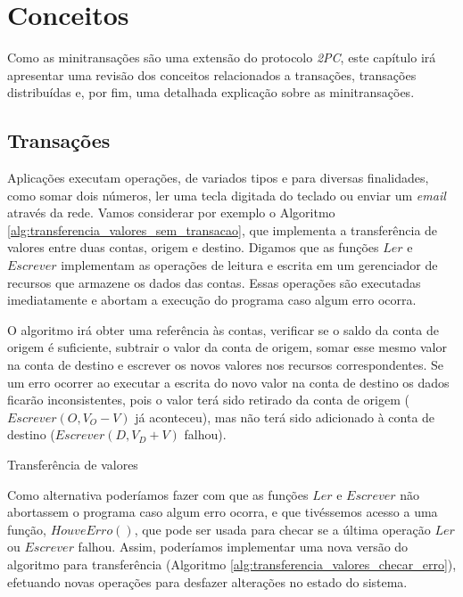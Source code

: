 \documentclass[11pt,twoside,a4paper]{book}
\begin{document}
\chapter{Conceitos}
\label{chap:conceitos}
Como as minitransações são uma extensão do protocolo \emph{2PC}, este capítulo irá apresentar uma revisão dos conceitos relacionados a transações, transações distribuídas e, por fim, uma detalhada explicação sobre as minitransações.

\section{Transações}
\label{sec:transacoes}
Aplicações executam operações, de variados tipos e para diversas finalidades, como somar dois números, ler uma tecla digitada do teclado ou enviar um \emph{email} através da rede. Vamos considerar por exemplo o Algoritmo \ref{alg:transferencia_valores_sem_transacao}, que implementa a transferência de valores entre duas contas, origem e destino. Digamos que as funções $Ler$ e $Escrever$ implementam as operações de leitura e escrita em um gerenciador de recursos que armazene os dados das contas. Essas operações são executadas imediatamente e abortam a execução do programa caso algum erro ocorra.

O algoritmo irá obter uma referência às contas, verificar se o saldo da conta de origem é suficiente, subtrair o valor da conta de origem, somar esse mesmo valor na conta de destino e escrever os novos valores nos recursos correspondentes. Se um erro ocorrer ao executar a escrita do novo valor na conta de destino os dados ficarão inconsistentes, pois o valor terá sido retirado da conta de origem ($Escrever(O, V_O - V)$ já aconteceu), mas não terá sido adicionado à conta de destino ($Escrever(D, V_D + V)$ falhou).

\begin{algorithm}
\caption{Transferência de valores}
\label{alg:transferencia_valores_sem_transacao}
\dontprintsemicolon
{}
\end{algorithm}

Como alternativa poderíamos fazer com que as funções $Ler$ e $Escrever$ não abortassem o programa caso algum erro ocorra, e que tivéssemos acesso a uma função, $HouveErro()$, que pode ser usada para checar se a última operação $Ler$ ou $Escrever$ falhou. Assim, poderíamos implementar uma nova versão do algoritmo para transferência (Algoritmo \ref{alg:transferencia_valores_checar_erro}), efetuando novas operações para desfazer alterações no estado do sistema.
\end{document}

